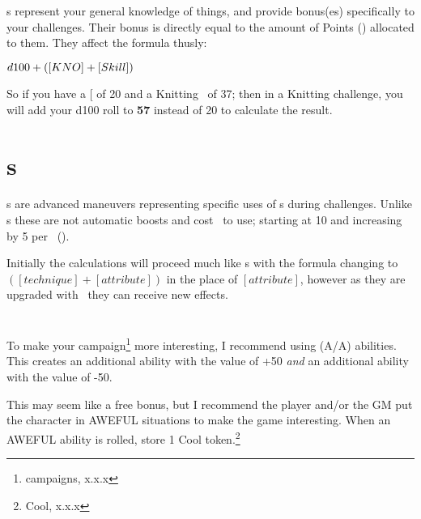 \skills s represent your general knowledge of things, and provide
bonus(es) specifically to your \KNOW  challenges. Their bonus is
directly equal to the amount of \skills Points (\skillval ) allocated
to them. They affect the formula thusly:

$d100+([KNO]+[Skill])$

So if you have a {[}\KNOW{]} of 20 and a Knitting \skills\  of 37;
then in a Knitting challenge, you will add your d100 roll to \textbf{57
}instead of 20 to calculate the result.


\section{\techn s}

\techn s are advanced maneuvers representing specific uses of \attribute s
during challenges. Unlike \skills s these are not automatic boosts
and cost \ENful\ to use; starting at 10 and increasing by 5 per \advancement\ (\advanmini). 

Initially the calculations will proceed much like \skills s with
the formula changing to $([technique]+[attribute])$ in the place
of $[attribute]$, however as they are upgraded with \advanmini\ they
can receive new effects.


\section{\AWEAWF{} }

To make your campaign\footnote{campaigns, x.x.x} more interesting,
I recommend using \AWEAWF (A/A) abilities. This creates an additional
ability with the value of +50 \emph{and} an additional ability with
the value of -50.

This may seem like a free bonus, but I recommend the player and/or
the GM put the character in AWEFUL situations to make the game interesting.
When an AWEFUL ability is rolled, store 1 Cool token.\footnote{Cool, x.x.x}

